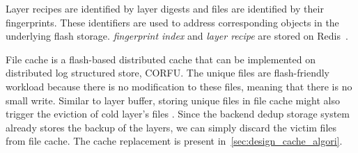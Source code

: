 Layer recipes are identified by layer digests and files are identified by their fingerprints.
These identifiers are used to address corresponding objects in the underlying flash storage.
\emph{fingerprint index} and \emph{layer recipe} are stored on Redis~\cite{redis}.

File cache is a flash-based distributed cache that can be implemented on distributed log structured store, \eg CORFU.
The unique files are flash-friendly workload because there is no modification to these files, meaning that there is no small write.
Similar to layer buffer, storing unique files in file cache might also trigger the eviction of cold layer's files .
Since the backend dedup storage system already stores the backup of the layers, 
we can simply discard the victim files from file cache.
The cache replacement is present in~\cref{sec:design_cache_algori}. 

%
%
%

